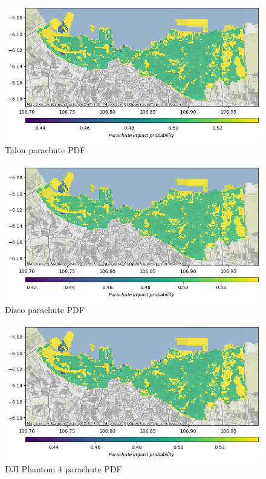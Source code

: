 \documentclass[12pt]{report}
\begin{document}
        \begin{figure}[H]
            \centering
            \includegraphics[width=\textwidth]{Plot/talon/parachute_pdf.png}
            \caption{Talon parachute PDF}
            \label{fig:talon_parachute}
        \end{figure}
        \begin{figure}[H]
            \centering
            \includegraphics[width=\textwidth]{Plot/parrot/parachute_pdf.png}
            \caption{Disco parachute PDF}
            \label{fig:disco_parachute}
        \end{figure}
        \begin{figure}[H]
            \centering
            \includegraphics[width=\textwidth]{Plot/phantom4/parachute_pdf.png}
            \caption{DJI Phantom 4 parachute PDF}
            \label{fig:phantom_parachute}
        \end{figure}
\end{document}
